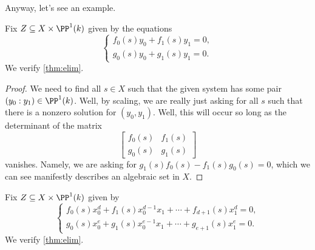 Anyway, let's see an example.
\begin{exe}
	Fix $Z\subseteq X\times\PP^1(k)$ given by the equations
	\[\begin{cases}
		f_0(s)y_0+f_1(s)y_1=0, \\
		g_0(s)y_0+g_1(s)y_1=0.
	\end{cases}\]
	We verify \autoref{thm:elim}.
\end{exe}
\begin{proof}
	We need to find all $s\in X$ such that the given system has some pair $(y_0:y_1)\in\PP^1(k)$. Well, by scaling, we are really just asking for all $s$ such that there is a nonzero solution for $(y_0,y_1)$. Well, this will occur so long as the determinant of the matrix
	\[\begin{bmatrix}
		f_0(s) & f_1(s) \\
		g_0(s) & g_1(s)
	\end{bmatrix}\]
	vanishes. Namely, we are asking for $g_1(s)f_0(s)-f_1(s)g_0(s)=0$, which we can see manifestly describes an algebraic set in $X$.
\end{proof}
\begin{exe}[Sylvester]
	Fix $Z\subseteq X\times\PP^1(k)$ given by
	\[\begin{cases}
		f_0(s)x_0^d+f_1(s)x_0^{d-1}x_1+\cdots+f_{d+1}(s)x_1^d=0, \\
		g_0(s)x_0^e+g_1(s)x_0^{e-1}x_1+\cdots+g_{e+1}(s)x_1^e=0.
	\end{cases}\]
	We verify \autoref{thm:elim}.
\end{exe}
